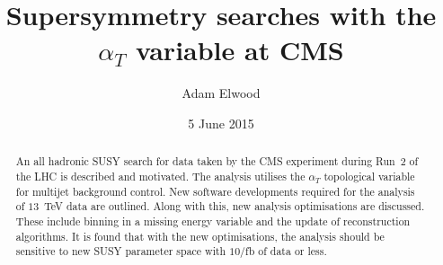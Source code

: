 

\title{Supersymmetry searches with the $\alpha_T$ variable at CMS}
\date{5 June 2015}
\author{Adam Elwood}

\maketitle        
        
\begin{abstract}
  \noindent
An all hadronic SUSY search for data taken by the CMS experiment during Run~2 of the LHC is described and motivated. The analysis utilises the $\alpha_T$ topological variable for multijet background control. New software developments required for the analysis of $13$~TeV data are outlined. Along with this, new analysis optimisations are discussed. These include binning in a missing energy variable and the update of reconstruction algorithms. It is found that with the new optimisations, the analysis should be sensitive to new SUSY parameter space with $10/$fb of data or less.
\end{abstract}












